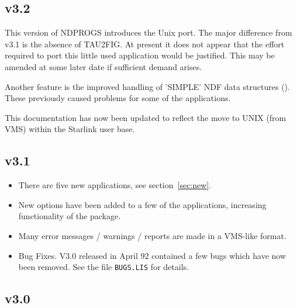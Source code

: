 \subsection{v3.2}

This version of NDPROGS introduces the Unix port. The major difference
from v3.1 is the absence of TAU2FIG. At present it does not appear that
the effort required to port this little used application would be
justified. This may be amended at some later date if sufficient demand
arises.

Another feature is the improved handling of 'SIMPLE' NDF data
structures (). These previously caused problems for some of the
applications.

This documentation has now been updated to reflect the move to
UNIX (from VMS) within the Starlink user base.

\subsection{v3.1}

\begin{itemize}

\item There are five new applications, see section~\ref{sec:new}.

\item New options have been added to a few of the applications,
increasing functionality of the package.

\item Many error messages / warnings / reports are made in a VMS-like
format.

\item Bug Fixes. V3.0 released in April 92 contained a few bugs which
have now been removed. See the file {\tt BUGS.LIS} for details.

\end {itemize}

\subsection{v3.0}


